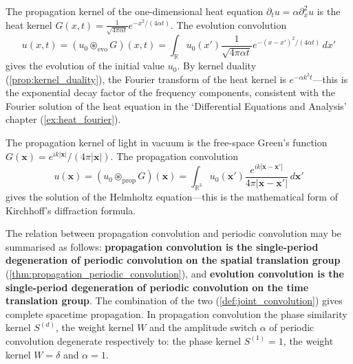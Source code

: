 \begin{example}\label{ex:heat_evolution_convolution}
The propagation kernel of the one-dimensional heat equation $\partial_t u = \alpha\partial_x^2 u$ is the heat kernel $G(x,t) = \frac{1}{\sqrt{4\pi\alpha t}}e^{-x^2/(4\alpha t)}$. The evolution convolution
\[
u(x,t) = (u_0\circledast_{\text{evo}}G)(x,t) = \int_{\mathbb{R}}u_0(x')\frac{1}{\sqrt{4\pi\alpha t}}e^{-(x-x')^2/(4\alpha t)}\,dx'
\]
gives the evolution of the initial value $u_0$. By kernel duality (\cref{prop:kernel_duality}), the Fourier transform of the heat kernel is $e^{-\alpha k^2 t}$---this is the exponential decay factor of the frequency components, consistent with the Fourier solution of the heat equation in the `Differential Equations and Analysis' chapter (\cref{ex:heat_fourier}).
\end{example}

\begin{example}\label{ex:free_space_optical_convolution}
The propagation kernel of light in vacuum is the free-space Green's function $G(\mathbf{x}) = e^{ik|\mathbf{x}|}/(4\pi|\mathbf{x}|)$. The propagation convolution
\[
u(\mathbf{x}) = (u_0\circledast_{\text{prop}}G)(\mathbf{x}) = \int_{\mathbb{R}^3}u_0(\mathbf{x}')\frac{e^{ik|\mathbf{x}-\mathbf{x}'|}}{4\pi|\mathbf{x}-\mathbf{x}'|}\,d\mathbf{x}'
\]
gives the solution of the Helmholtz equation---this is the mathematical form of Kirchhoff's diffraction formula.
\end{example}

\begin{remark}\label{rem:propagation_convolution_summary}
The relation between propagation convolution and periodic convolution may be summarised as follows: \textbf{propagation convolution is the single-period degeneration of periodic convolution on the spatial translation group} (\cref{thm:propagation_periodic_convolution}), and \textbf{evolution convolution is the single-period degeneration of periodic convolution on the time translation group}. The combination of the two (\cref{def:joint_convolution}) gives complete spacetime propagation. In propagation convolution the phase similarity kernel $S^{(d)}$, the weight kernel $W$ and the amplitude switch $\alpha$ of periodic convolution degenerate respectively to: the phase kernel $S^{(1)}=1$, the weight kernel $W=\delta$ and $\alpha=1$.
\end{remark}


